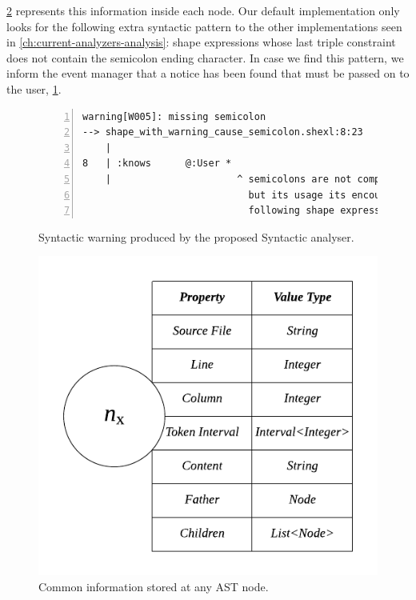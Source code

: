 \cref{fig:shex-lite-node-info} represents this information inside each node. Our default implementation only looks for the
following extra syntactic pattern to the other implementations seen in \cref{ch:current-analyzers-analysis}: shape expressions whose last
triple constraint does not contain the semicolon ending character. In case we find this pattern, we inform the event manager
that a notice has been found that must be passed on to the user, \cref{fig:sin-err-example}.

\begin{figure}
    \begin{lstlisting}[numbers=left,basicstyle=\ttfamily\scriptsize]
warning[W005]: missing semicolon
--> shape_with_warning_cause_semicolon.shexl:8:23
    |
8   | :knows      @:User *
    |                      ^ semicolons are not compulsory in the last triple constraint,
                             but its usage its encouraged as otherwise your code wont be
                             following shape expressions specification.
    \end{lstlisting}
    \caption[Syntactic warning produced by the proposed Syntactic analyser]{Syntactic warning produced by the proposed Syntactic analyser.}
    \label{fig:sin-err-example}
\end{figure}

\begin{figure}
    \includegraphics[scale=0.7]{images/shex-lite-node-table.pdf}
    \centering
    \caption[Common information stored at any AST node]{Common information stored at any AST node.}
    \label{fig:shex-lite-node-info}
\end{figure}

